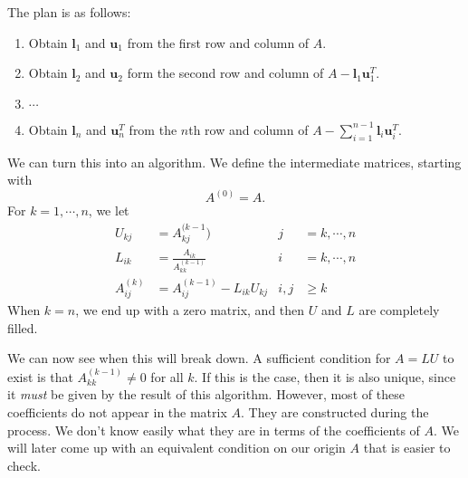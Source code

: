 \documentclass[a4paper]{article}
\begin{document}
The plan is as follows:
\begin{enumerate}
  \item Obtain $\mathbf{l}_1$ and $\mathbf{u}_1$ from the first row and column of $A$.
  \item Obtain $\mathbf{l}_2$ and $\mathbf{u}_2$ form the second row and column of $A - \mathbf{l}_1 \mathbf{u}_1^T$.
  \item $\cdots$
  \item Obtain $\mathbf{l}_n$ and $\mathbf{u}_n^T$ from the $n$th row and column of $A - \sum_{i = 1}^{n - 1} \mathbf{l}_i \mathbf{u}_i^T$.
\end{enumerate}
We can turn this into an algorithm. We define the intermediate matrices, starting with
\[
  A^{(0)} = A.
\]
For $k = 1, \cdots, n$, we let
\begin{align*}
  U_{kj} &= A_{kj}^{(k - 1}) & j &=k, \cdots, n\\
  L_{ik} &= \frac{A_{ik}}{A_{kk}^{(k - 1)}} & i &= k, \cdots, n\\
  A_{ij}^{(k)} &= A_{ij}^{(k - 1)} - L_{ik} U_{kj} & i, j &\geq k
\end{align*}
When $k = n$, we end up with a zero matrix, and then $U$ and $L$ are completely filled.

We can now see when this will break down. A sufficient condition for $A = LU$ to exist is that $A_{kk}^{(k - 1)} \not= 0$ for all $k$. If this is the case, then it is also unique, since it \emph{must} be given by the result of this algorithm. However, most of these coefficients do not appear in the matrix $A$. They are constructed during the process. We don't know easily what they are in terms of the coefficients of $A$. We will later come up with an equivalent condition on our origin $A$ that is easier to check.
\end{document}
